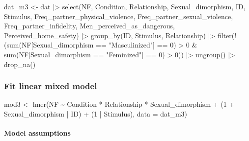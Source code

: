\documentclass[
  bookmarksnumbered]{article}
\newenvironment{Shaded}{\begin{snugshade}}{\end{snugshade}}
\newcommand{\AttributeTok}[1]{\textcolor[rgb]{0.80,0.80,0.80}{#1}}
\newcommand{\DecValTok}[1]{\textcolor[rgb]{0.86,0.86,0.80}{#1}}
\newcommand{\FunctionTok}[1]{\textcolor[rgb]{0.94,0.94,0.56}{#1}}
\newcommand{\NormalTok}[1]{\textcolor[rgb]{0.80,0.80,0.80}{#1}}
\newcommand{\OtherTok}[1]{\textcolor[rgb]{0.94,0.94,0.56}{#1}}
\newcommand{\SpecialCharTok}[1]{\textcolor[rgb]{0.86,0.64,0.64}{#1}}
\newcommand{\StringTok}[1]{\textcolor[rgb]{0.80,0.58,0.58}{#1}}
\begin{document}
\begin{Shaded}
\begin{Highlighting}[]
\NormalTok{dat\_m3 }\OtherTok{\textless{}{-}}\NormalTok{ dat }\SpecialCharTok{|\textgreater{}} 
  \FunctionTok{select}\NormalTok{(NF, Condition, Relationship, Sexual\_dimorphism,}
\NormalTok{         ID, Stimulus, }
\NormalTok{         Freq\_partner\_physical\_violence, Freq\_partner\_sexual\_violence,}
\NormalTok{         Freq\_partner\_infidelity, Men\_perceived\_as\_dangerous,}
\NormalTok{         Perceived\_home\_safety) }\SpecialCharTok{|\textgreater{}} 
  \FunctionTok{group\_by}\NormalTok{(ID, Stimulus, Relationship) }\SpecialCharTok{|\textgreater{}} 
  \FunctionTok{filter}\NormalTok{(}\SpecialCharTok{!}\NormalTok{(}\FunctionTok{sum}\NormalTok{(NF[Sexual\_dimorphism }\SpecialCharTok{==} \StringTok{"Masculinized"}\NormalTok{] }\SpecialCharTok{==} \DecValTok{0}\NormalTok{) }\SpecialCharTok{\textgreater{}} \DecValTok{0} \SpecialCharTok{\&} 
             \FunctionTok{sum}\NormalTok{(NF[Sexual\_dimorphism }\SpecialCharTok{==} \StringTok{"Feminized"}\NormalTok{] }\SpecialCharTok{==} \DecValTok{0}\NormalTok{) }\SpecialCharTok{\textgreater{}} \DecValTok{0}\NormalTok{)) }\SpecialCharTok{|\textgreater{}}
  \FunctionTok{ungroup}\NormalTok{() }\SpecialCharTok{|\textgreater{}} 
  \FunctionTok{drop\_na}\NormalTok{()}
\end{Highlighting}
\end{Shaded}

\subsubsection{Fit linear mixed model}\label{fit-linear-mixed-model-2}

\begin{Shaded}
\begin{Highlighting}[]
\NormalTok{mod3 }\OtherTok{\textless{}{-}} \FunctionTok{lmer}\NormalTok{(NF }\SpecialCharTok{\textasciitilde{}}\NormalTok{ Condition }\SpecialCharTok{*}\NormalTok{ Relationship }\SpecialCharTok{*}\NormalTok{ Sexual\_dimorphism }\SpecialCharTok{+}
\NormalTok{               (}\DecValTok{1} \SpecialCharTok{+}\NormalTok{ Sexual\_dimorphism }\SpecialCharTok{|}\NormalTok{ ID) }\SpecialCharTok{+}\NormalTok{ (}\DecValTok{1} \SpecialCharTok{|}\NormalTok{ Stimulus), }
             \AttributeTok{data =}\NormalTok{ dat\_m3)}
\end{Highlighting}
\end{Shaded}

\paragraph{Model assumptions}\label{model-assumptions-2}
\end{document}
